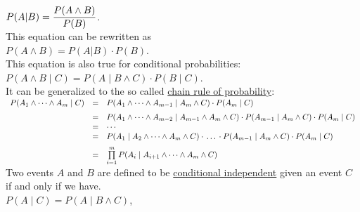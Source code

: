 \\[0.2cm]
\hspace*{1.3cm}
$\displaystyle P(A|B) = \frac{P(A \wedge B)}{P(B)}$.
\\[0.2cm]
This equation can be rewritten as
\\[0.2cm]
\hspace*{1.3cm}
$P(A \wedge B) = P(A|B) \cdot P(B)$.
\\[0.2cm]
This equation is also true for conditional probabilities:
\\[0.2cm]
\hspace*{1.3cm}
$P(A \wedge B\;|\;C) = P(A\;|\;B \wedge C) \cdot P(B\;|\;C)$.
\\[0.2cm]
It can be generalized to the so called \href{https://en.wikipedia.org/wiki/Chain_rule_(probability)}{chain rule of probability}:
\\[0.2cm]
\hspace*{1.3cm}
$
\begin{array}[t]{lcl}
       P(A_1 \wedge \cdots \wedge A_m \;|\;C) 
 & = & P(A_1 \wedge  \cdots \wedge A_{m-1}\;|\;A_{m} \wedge C) \cdot P(A_{m}\;|\;C) \\[0.2cm]
 & = & P(A_1 \wedge  \cdots \wedge A_{m-2}\;|\;A_{m-1} \wedge A_{m} \wedge C) \cdot P(A_{m-1} \;|\;A_m \wedge C)\cdot P(A_{m}\;|\;C) \\
 & = & \cdots \\
 & = &  P(A_1 \;|\; A_2 \wedge  \cdots \wedge A_{m} \wedge C) \cdot \,\dots\, \cdot P(A_{m-1} \;|\;A_m \wedge C)\cdot P(A_{m}\;|\;C) \\[0.2cm]
 & = & \prod\limits_{i=1}^m P(A_i \;|\; A_{i+1} \wedge  \cdots \wedge A_{m} \wedge C) 
\end{array}
$
\\[0.2cm]
Two events $A$ and $B$ are defined to be \href{https://en.wikipedia.org/wiki/Conditional_independence}{conditional independent}
given an event $C$ if and only if we have.
\\[0.2cm]
\hspace*{1.3cm}
$P(A \;|\; C) = P(A \;|\; B \wedge C)$,
\\[0.2cm]

